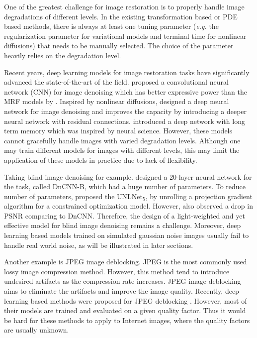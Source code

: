 \documentclass{article} %
\begin{document}
One of the greatest challenge for image restoration is to properly
handle image degradations of different levels. In the existing
transformation based or PDE based methods, there is always at least one
tuning parameter (\textit{e.g.} the regularization parameter for variational models
and terminal time for nonlinear diffusions) that needs to be
manually selected. The choice of the parameter heavily relies on
the degradation level.

Recent years, deep learning models for image restoration tasks
have significantly advanced the state-of-the-art of the field.
\cite{jain2009natural} proposed a convolutional neural network (CNN)
for image denoising which has better expressive power than the MRF models
by \cite{lan2006efficient}. Inspired by nonlinear diffusions,
\cite{Chen2017Trainable} designed a deep neural network
for image denoising and \cite{zhang2017beyond} improves the capacity
by introducing a deeper neural network with residual connections.
\cite{tai2017memnet} introduced a deep network with long term memory
which was inspired by neural science. However, these models
cannot gracefully handle images with varied degradation levels.
Although one may train different models for images with different levels,
this may limit the application of these models in practice due to
lack of flexibility.

Taking blind image denoising for example. \cite{zhang2017beyond}
designed a 20-layer neural network for the task, called DnCNN-B,
which had a huge number of parameters.
To reduce number of parameters, \cite{lefkimmiatis2017universal}
proposed the UNLNet$_5$, by unrolling a projection gradient algorithm
for a constrained optimization model. However,
\cite{lefkimmiatis2017universal} also observed a drop in PSNR comparing
to DnCNN. Therefore, the design of a light-weighted and yet effective model
for blind image denoising remains a challenge. Moreover,
deep learning based models trained on simulated gaussian noise
images usually fail to handle real world noise,
as will be illustrated in later sections.

Another example is JPEG image deblocking. JPEG is
the most commonly used lossy image compression method. However,
this method tend to introduce undesired artifacts as
the compression rate increases. JPEG image deblocking aims to eliminate
the artifacts and improve the image quality. Recently,
deep learning based methods were proposed for JPEG deblocking
\citep{dong2015compression,zhang2017beyond,zhang2018dmcnn}.
However, most of their models are trained and evaluated on a given
quality factor. Thus it would be hard for these methods to apply to
Internet images, where the quality factors are usually unknown.
\end{document}
